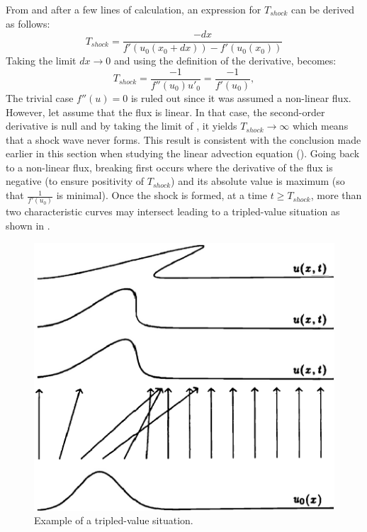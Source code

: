 %
From  and after a few lines of calculation, an expression for $T_{shock}$ can be derived as follows: 
\begin{equation}\label{eq:cc2a_sct1b}
T_{shock} = \frac{-dx}{f'(u_0(x_0+dx))-f'(u_0(x_0))}
\end{equation} 
Taking the limit $dx \to 0$ and using the definition of the derivative,  becomes:
\begin{equation}\label{eq:cc2_sct1b}
T_{shock} = \frac{-1}{f''(u_0) u'_0} = \frac{-1}{f'(u_0)},
\end{equation} 
The trivial case $f''(u) = 0$ is ruled out since it was assumed a non-linear flux. However, let assume that the flux is linear. In that case, the second-order derivative is null and by taking the limit of , it yields $T_{shock} \to \infty$ which means that a shock wave never forms. This result is consistent with the conclusion made earlier in this section when studying the linear advection equation (). Going back to a non-linear flux, breaking first occurs where the derivative of the flux is negative (to ensure positivity of $T_{shock}$) and its absolute value is maximum (so that $\frac{1}{f'(u_0)}$ is minimal). Once the shock is formed, at a time $t \geq T_{shock}$, more than two characteristic curves may intersect leading to a tripled-value situation as shown in . 
%
\begin{figure}[H]
\centering
\includegraphics[width=\textwidth]{figures/charact_curves_burger.png}
\caption{Example of a tripled-value situation.}
\label{fig:triple_pt_bg_sct1b}
\end{figure}
